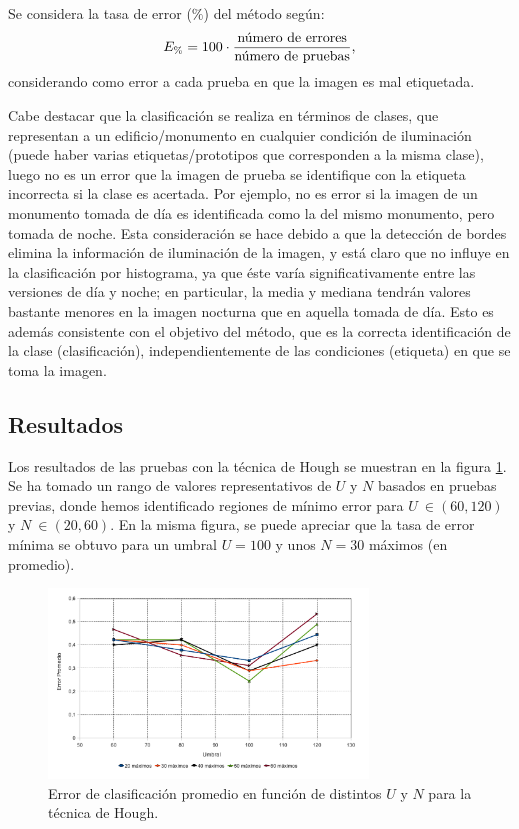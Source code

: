 \documentclass[conference,a4paper,10pt,oneside,final]{tfmpd}
\begin{document}
Se considera la tasa de error ($\%$) del método según:
\begin{equation}
E_\%=100\cdot\frac{\textrm{número de errores}}{\textrm{número de pruebas}},
\end{equation}
considerando como error a cada prueba en que la imagen es mal etiquetada.

Cabe destacar que la clasificación se realiza en términos de clases, que
representan a un edificio/monumento en cualquier condición de iluminación
(puede haber varias etiquetas/prototipos que corresponden a la misma clase),
luego no es un error que la imagen de prueba se identifique con la etiqueta
incorrecta si la clase es acertada.
Por ejemplo, no es error si la imagen de un monumento tomada de día es
identificada como la del mismo monumento, pero tomada de noche.
Esta consideración se hace debido a que la detección de bordes elimina la
información de iluminación de la imagen, y está claro que no influye
en la clasificación por histograma, ya que éste varía significativamente
entre las versiones de día y noche; en particular, la media y mediana tendrán
valores bastante menores en la imagen nocturna que en aquella tomada de día.
Esto es además consistente con el objetivo del método, que es la correcta
identificación de la clase (clasificación), independientemente de las
condiciones (etiqueta) en que se toma la imagen.
%
%
\subsection{Resultados}
Los resultados de las pruebas con {la técnica} de Hough
se muestran en la figura
\ref{graficaerror}. Se ha tomado un rango de valores representativos de $U$
y $N$ basados en pruebas previas, donde hemos identificado regiones de mínimo
error para $U~\in(60,120)$ y $N~\in(20,60)$.
En la misma figura, se puede apreciar que la tasa de error mínima se obtuvo
para un umbral $U = 100$ y unos $N = 30$ máximos (en promedio).

\begin{figure}
\begin{center}
\includegraphics[width=8.5cm]{../diagramas/estadistica_noche_iguales}
\end{center}
\caption{Error de clasificación promedio en función de distintos $U$ y $N$ para
{la técnica} de Hough.}
\label{graficaerror}
\end{figure}
\end{document}
